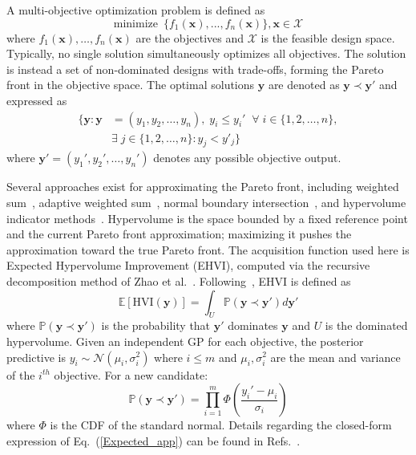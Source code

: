 A multi-objective optimization problem is defined as
\begin{equation}
\label{eq:problem_app}
    \mbox{minimize}\,\,\,  \{f_1(\textbf{x}), ...,f_n(\textbf{x})\}, \textbf{x} \in \mathcal{X}
\end{equation}
where $f_1(\textbf{x}),\ldots, f_n(\textbf{x})$ are the objectives and $\mathcal{X}$ is the feasible design space. Typically, no single solution simultaneously optimizes all objectives. The solution is instead a set of non-dominated designs with trade-offs, forming the Pareto front in the objective space. The optimal solutions $\mathbf{y}$ are denoted as $\mathbf{y}\prec \mathbf{y'}$ and expressed as
\begin{equation}
\begin{aligned}
   \{\mathbf{y}: \mathbf{y} & = (y_1, y_2, \ldots, y_n), \; y_i \leq y_i' \;\; \forall \; i \in \{1, 2, \ldots, n\}, \\
   &  \exists \; j \in \{1, 2, \ldots, n\} : y_j < y'_j\}
\end{aligned}
\end{equation}
where $\mathbf{y}' = (y_1', y_2', \ldots, y_n')$ denotes any possible objective output.

Several approaches exist for approximating the Pareto front, including weighted sum~\cite{marler2010weighted}, adaptive weighted sum~\cite{kim2005adaptive}, normal boundary intersection~\cite{das1998normal}, and hypervolume indicator methods~\cite{beume2009s,bradstreet2010fast,emmerich2011hypervolume,fonseca2006improved,russo2013quick,yang2007novel,zitzler1999multiobjective}. Hypervolume is the space bounded by a fixed reference point and the current Pareto front approximation; maximizing it pushes the approximation toward the true Pareto front. The acquisition function used here is Expected Hypervolume Improvement (EHVI), computed via the recursive decomposition method of Zhao et al.~\cite{zhao2018fast}. Following~\cite{feliot2017bayesian}, EHVI is defined as
\begin{equation}
    \mathbb{E}[\textrm{{HVI}}({\mathbf{y}})] =\int_U \mathbb{P}(\mathbf{y} \prec{\mathbf{y}'})d{{\mathbf{y}'}}
    \label{Expected_app}
\end{equation}
where $\mathbb{P}(\mathbf{y} \prec \mathbf{y}')$ is the probability that $\mathbf{y}'$ dominates $\mathbf{y}$ and $U$ is the dominated hypervolume. Given an independent GP for each objective, the posterior predictive is $y_i \sim \mathcal{N}(\mu_i , \sigma_i^2)$ where $i\leq m$ and $\mu_i,\sigma_i^2$ are the mean and variance of the $i^{th}$ objective. For a new candidate:
\begin{equation}
    \mathbb{P}(\mathbf{y} \prec \mathbf{y}') = \prod_{i=1}^m \Phi \left ( \frac{y_i' - \mu_i}{\sigma_i} \right )
    \label{prob_app}
\end{equation}
where $\Phi$ is the CDF of the standard normal. Details regarding the closed-form expression of Eq.~(\ref{Expected_app}) can be found in Refs.~\cite{zhao2018fast,feliot2017bayesian,while2011fast,jaszkiewicz2018improved,khatamsaz2020efficient}.

